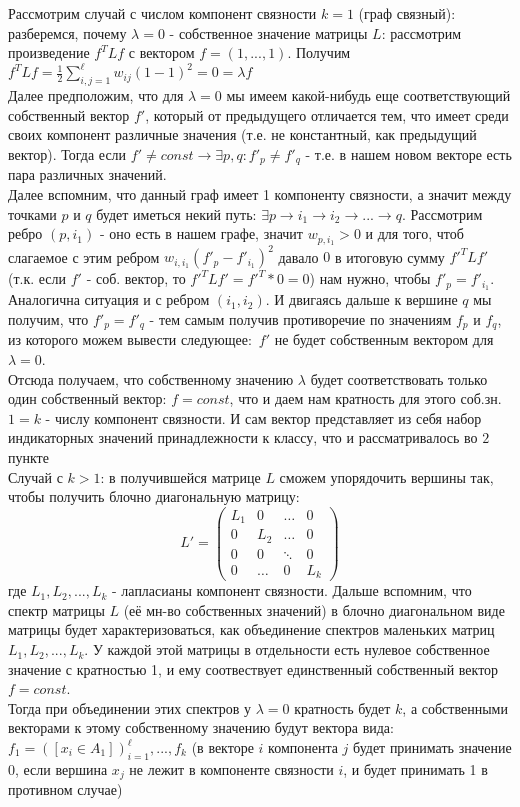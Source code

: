 \documentclass[12pt,fleqn]{article}
\begin{document}
\begin{vkProof}
	Рассмотрим случай с числом компонент связности $k = 1$ (граф связный):
	разберемся, почему $\lambda = 0$ - собственное значение матрицы $L$: рассмотрим произведение $f^TLf$ с вектором $f = (1,...,1)$. Получим $f^TLf = \frac{1}{2}\sum^{\ell}_{i,j=1}w_{ij}(1 - 1)^2=0=\lambda f$\\
	Далее предположим, что для $\lambda = 0$ мы имеем какой-нибудь еще соответствующий собственный вектор $f'$, который от предыдущего отличается тем, что имеет среди своих компонент различные значения (т.е. не константный, как предыдущий вектор). Тогда если $f' \neq const \to \exists p,q: f'_p\neq f'_q$ - т.е. в нашем новом векторе есть пара различных значений.\\
	Далее вспомним, что данный граф имеет 1 компоненту связности, а значит между точками $p$ и $q$ будет иметься некий путь: $\exists p\to i_1 \to i_2 \to ... \to q$. Рассмотрим ребро $(p,i_1)$ - оно есть в нашем графе, значит $w_{p,i_1} > 0$ и для того, чтоб слагаемое с этим ребром $w_{i,i_1}(f'_p - f'_{i_1})^2$ давало $0$ в итоговую сумму $f'^TLf'$ (т.к. если $f'$ - соб. вектор, то $f'^TLf' = f'^T * 0 = 0$) нам нужно, чтобы $f'_p = f'_{i_1}$. Аналогична ситуация и с ребром $(i_1,i_2)$. И двигаясь дальше к вершине $q$ мы получим, что $f'_p=f'_q$ - тем самым получив противоречие по значениям $f_p$ и $f_q$, из которого можем вывести следующее:~$f'$ не будет собственным вектором для $\lambda = 0$.\\
	Отсюда получаем, что собственному значению $\lambda$ будет соответствовать только один собственный вектор: $f = const$, что и даем нам кратность для этого соб.зн. $1 = k$ - числу компонент связности. И сам вектор представляет из себя набор индикаторных значений принадлежности к классу, что и рассматривалось во $2$ пункте\\
	
	Случай с $k > 1$: в получившейся матрице $L$ сможем упорядочить вершины так, чтобы получить блочно диагональную матрицу:
	$$L' = 
	\begin{pmatrix}
	L_1 & 0 & \dots & 0 \\
	0 & L_2 & \dots & 0 \\
	0 & 0 & \ddots & 0 \\ 
	0 & \dots & 0 & L_k
	\end{pmatrix}$$
	где $L_1,L_2,...,L_k$ - лапласианы компонент связности. Дальше вспомним, что спектр матрицы $L$ (её мн-во собственных значений) в блочно диагональном виде матрицы будет характеризоваться, как объединение спектров маленьких матриц $L_1,L_2,...,L_k$. У каждой этой матрицы в отдельности есть нулевое собственное значение с кратностью 1, и ему соотвествует единственный собственный вектор $f=const$.\\
	Тогда при объединении этих спектров у $\lambda = 0$ кратность будет $k$, а собственными векторами к этому собственному значению будут вектора вида: $f_1=([x_i \in A_1])^{\ell}_{i=1},...,f_k$ (в векторе $i$ компонента $j$ будет принимать значение $0$, если вершина $x_j$ не лежит в компоненте связности $i$, и будет принимать 1 в противном случае)
\end{vkProof}
\end{document}
